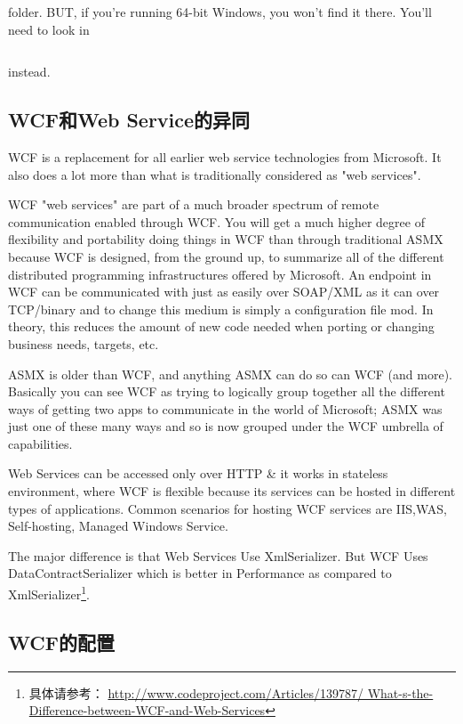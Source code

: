 \documentclass{book}
\begin{document}
folder. BUT, if you’re running 64-bit Windows, you won’t find it there. You’ll need to look in
\begin{lstlisting}[language=Bash]
%SystemDrive%\Program Files (x86)\Microsoft Visual Studio 10.0\Common7\IDE folder
\end{lstlisting}
 
instead.

\subsection{WCF和Web Service的异同}

WCF is a replacement for all earlier web service technologies from Microsoft. 
It also does a lot more than what is traditionally considered as "web services".

WCF "web services" are part of a much broader spectrum of remote communication enabled through WCF. 
You will get a much higher degree of flexibility and portability doing things in WCF than through 
traditional ASMX because WCF is designed, 
from the ground up, to summarize all of the different distributed programming infrastructures offered by Microsoft.
 An endpoint in WCF can be communicated with just as easily over SOAP/XML as it 
 can over TCP/binary and to change this medium is simply a configuration file mod. 
In theory, this reduces the amount of new code needed when porting or changing business needs, targets, etc.

ASMX is older than WCF, 
and anything ASMX can do so can WCF (and more). 
Basically you can see WCF as trying to logically group together all the different ways of getting two apps to communicate in the world of Microsoft; 
ASMX was just one of these many ways and so is now grouped under the WCF umbrella of capabilities.

Web Services can be accessed only over HTTP \& it works in stateless environment, 
where WCF is flexible because its services can be hosted in different types of applications. 
Common scenarios for hosting WCF services are IIS,WAS, Self-hosting, Managed Windows Service.

The major difference is that Web Services Use XmlSerializer. 
But WCF Uses DataContractSerializer which is better in Performance as compared to XmlSerializer\footnote{具体请参考：
\url{http://www.codeproject.com/Articles/139787/
What-s-the-Difference-between-WCF-and-Web-Services}}.

\subsection{WCF的配置}
\end{document}

